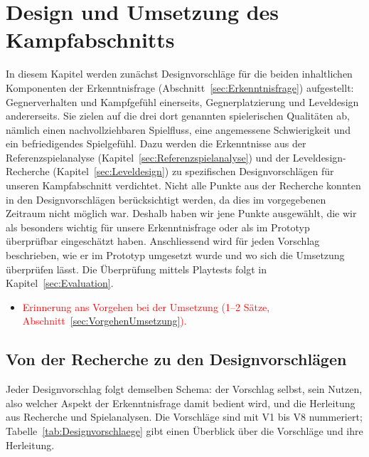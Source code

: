 \documentclass[../Main.tex]{subfiles}
\begin{document}
\section{Design und Umsetzung des Kampfabschnitts} \label{sec:Umsetzung}

In diesem Kapitel werden zunächst Designvorschläge für die beiden inhaltlichen Komponenten der Erkenntnisfrage (Abschnitt~\ref{sec:Erkenntnisfrage}) aufgestellt: Gegnerverhalten und Kampfgefühl einerseits, Gegnerplatzierung und Leveldesign andererseits. Sie zielen auf die drei dort genannten spielerischen Qualitäten ab, nämlich einen nachvollziehbaren Spielfluss, eine angemessene Schwierigkeit und ein befriedigendes Spielgefühl. Dazu werden die Erkenntnisse aus der Referenzspielanalyse (Kapitel~\ref{sec:Referenzspielanalyse}) und der Leveldesign-Recherche (Kapitel~\ref{sec:Leveldesign}) zu spezifischen Designvorschlägen für unseren Kampfabschnitt verdichtet. Nicht alle Punkte aus der Recherche konnten in den Designvorschlägen berücksichtigt werden, da dies im vorgegebenen Zeitraum nicht möglich war. Deshalb haben wir jene Punkte ausgewählt, die wir als besonders wichtig für unsere Erkenntnisfrage oder als im Prototyp überprüfbar eingeschätzt haben. Anschliessend wird für jeden Vorschlag beschrieben, wie er im Prototyp umgesetzt wurde und wo sich die Umsetzung überprüfen lässt. Die Überprüfung mittels Playtests folgt in Kapitel~\ref{sec:Evaluation}.

\begin{itemize}[leftmargin=1.5cm]
    \item \textcolor{red}{Erinnerung ans Vorgehen bei der Umsetzung (1--2 Sätze, Abschnitt~\ref{sec:VorgehenUmsetzung}).}
\end{itemize}

\subsection{Von der Recherche zu den Designvorschlägen} \label{sec:Designvorschlaege}

Jeder Designvorschlag folgt demselben Schema: der Vorschlag selbst, sein Nutzen, also welcher Aspekt der Erkenntnisfrage damit bedient wird, und die Herleitung aus Recherche und Spielanalysen. Die Vorschläge sind mit V1 bis V8 nummeriert; Tabelle~\ref{tab:Designvorschlaege} gibt einen Überblick über die Vorschläge und ihre Herleitung.
\end{document}
